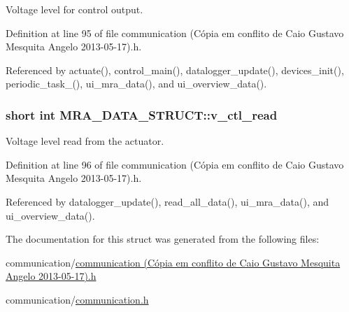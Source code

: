 Voltage level for control output. 



Definition at line 95 of file communication (\-Cópia em conflito de Caio Gustavo Mesquita Angelo 2013-\/05-\/17).\-h.



Referenced by actuate(), control\-\_\-main(), datalogger\-\_\-update(), devices\-\_\-init(), periodic\-\_\-task\-\_(), ui\-\_\-mra\-\_\-data(), and ui\-\_\-overview\-\_\-data().

\hypertarget{structMRA__DATA__STRUCT_a3a31d57268c33b21ac915fdc27dfe474}{
\subsubsection[{v\-\_\-ctl\-\_\-read}]{\setlength{\rightskip}{0pt plus 5cm}short int M\-R\-A\-\_\-\-D\-A\-T\-A\-\_\-\-S\-T\-R\-U\-C\-T\-::v\-\_\-ctl\-\_\-read}}\label{structMRA__DATA__STRUCT_a3a31d57268c33b21ac915fdc27dfe474}


Voltage level read from the actuator. 



Definition at line 96 of file communication (\-Cópia em conflito de Caio Gustavo Mesquita Angelo 2013-\/05-\/17).\-h.



Referenced by datalogger\-\_\-update(), read\-\_\-all\-\_\-data(), ui\-\_\-mra\-\_\-data(), and ui\-\_\-overview\-\_\-data().



The documentation for this struct was generated from the following files\-:\begin{DoxyCompactItemize}
\item 
communication/\hyperlink{communication_01_07C_xC3_xB3pia_01em_01conflito_01de_01Caio_01Gustavo_01Mesquita_01Angelo_012013-05-17_08_8h}{communication (\-Cópia em conflito de Caio Gustavo Mesquita Angelo 2013-\/05-\/17).\-h}\item 
communication/\hyperlink{communication_2communication_8h}{communication.\-h}\end{DoxyCompactItemize}
